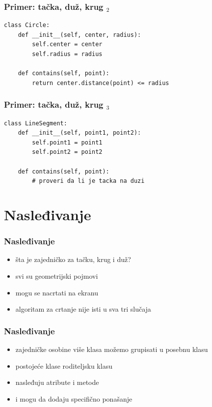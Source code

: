 \documentclass[utf8,compress,aspectratio=169]{beamer}
\begin{document}
\begin{frame}[fragile]
  \frametitle{Primer: tačka, duž, krug $_2$}
\begin{verbatim}
class Circle:
    def __init__(self, center, radius):
        self.center = center
        self.radius = radius

    def contains(self, point):
        return center.distance(point) <= radius
\end{verbatim}
\end{frame}

\begin{frame}[fragile]
  \frametitle{Primer: tačka, duž, krug $_3$}
\begin{verbatim}
class LineSegment:
    def __init__(self, point1, point2):
        self.point1 = point1
        self.point2 = point2

    def contains(self, point):
        # proveri da li je tacka na duzi
\end{verbatim}
\end{frame}

\section[Nasleđivanje]{Nasleđivanje}

\begin{frame}[fragile]
  \frametitle{Nasleđivanje}
  \begin{itemize}
    \item šta je zajedničko za tačku, krug i duž?
    \item svi su geometrijski pojmovi
    \item mogu se nacrtati na ekranu
    \item algoritam za crtanje nije isti u sva tri slučaja
  \end{itemize}
\end{frame}

\begin{frame}[fragile]
  \frametitle{Nasleđivanje}
  \begin{itemize}
    \item zajedničke osobine više klasa možemo grupisati u posebnu  klasu
    \item postojeće klase  roditeljsku klasu
    \item nasleđuju atribute i metode
    \item i mogu da dodaju specifično ponašanje
  \end{itemize}
\end{frame}
\end{document}
